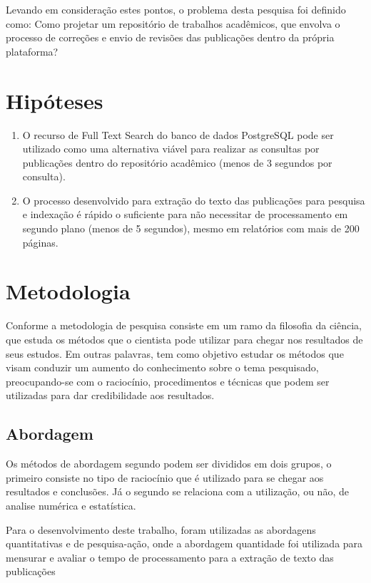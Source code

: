 Levando em consideração estes pontos, o problema desta pesquisa foi definido como: Como projetar um repositório de trabalhos acadêmicos, que envolva o processo de correções e envio de revisões das publicações dentro da própria plataforma?


\section{Hipóteses} \label{sec::Hypothesis}
\begin{enumerate}
    \item O recurso de Full Text Search do banco de dados PostgreSQL pode ser utilizado como uma alternativa viável para realizar as consultas por publicações dentro do repositório acadêmico (menos de 3 segundos por consulta).
    \item O processo desenvolvido para extração do texto das publicações para pesquisa e indexação é rápido o suficiente para não necessitar de processamento em segundo plano (menos de 5 segundos), mesmo em relatórios com mais de 200 páginas.
\end{enumerate}


\section{Metodologia} \label{sec:Methodology}

Conforme \citep[p. 15]{LOVATO:metodologia} a metodologia de pesquisa
consiste em um ramo da filosofia da ciência, que estuda os métodos que
o cientista pode utilizar para chegar nos resultados de seus estudos.
Em outras palavras, tem como objetivo estudar os métodos que visam
conduzir um aumento do conhecimento sobre o tema pesquisado, preocupando-se
com o raciocínio, procedimentos e técnicas que podem ser utilizadas para
dar credibilidade aos resultados.

\subsection{Abordagem}

Os métodos de abordagem segundo \citep[p. 29]{LOVATO:metodologia} podem ser
divididos em dois grupos, o primeiro consiste no tipo de raciocínio que
é utilizado para se chegar aos resultados e conclusões. Já o segundo
se relaciona com a utilização, ou não, de analise numérica e estatística.

Para o desenvolvimento deste trabalho, foram utilizadas as abordagens
quantitativas e de pesquisa-ação, onde a abordagem quantidade foi utilizada
para mensurar e avaliar o tempo de processamento para a extração de texto
das publicações

